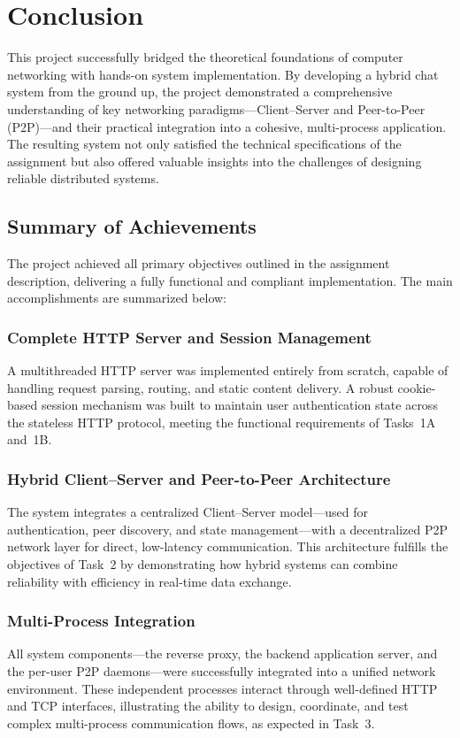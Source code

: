 \section{Conclusion}

This project successfully bridged the theoretical foundations of computer networking with hands-on system implementation. 
By developing a hybrid chat system from the ground up, the project demonstrated a comprehensive understanding of key networking paradigms—Client–Server and Peer-to-Peer (P2P)—and their practical integration into a cohesive, multi-process application. 
The resulting system not only satisfied the technical specifications of the assignment but also offered valuable insights into the challenges of designing reliable distributed systems.

\subsection{Summary of Achievements}

The project achieved all primary objectives outlined in the assignment description, delivering a fully functional and compliant implementation. 
The main accomplishments are summarized below:

\subsubsection{Complete HTTP Server and Session Management}
A multithreaded HTTP server was implemented entirely from scratch, capable of handling request parsing, routing, and static content delivery. 
A robust cookie-based session mechanism was built to maintain user authentication state across the stateless HTTP protocol, meeting the functional requirements of Tasks~1A and~1B.

\subsubsection{Hybrid Client–Server and Peer-to-Peer Architecture}
The system integrates a centralized Client–Server model—used for authentication, peer discovery, and state management—with a decentralized P2P network layer for direct, low-latency communication. 
This architecture fulfills the objectives of Task~2 by demonstrating how hybrid systems can combine reliability with efficiency in real-time data exchange.

\subsubsection{Multi-Process Integration}
All system components—the reverse proxy, the backend application server, and the per-user P2P daemons—were successfully integrated into a unified network environment. 
These independent processes interact through well-defined HTTP and TCP interfaces, illustrating the ability to design, coordinate, and test complex multi-process communication flows, as expected in Task~3.

